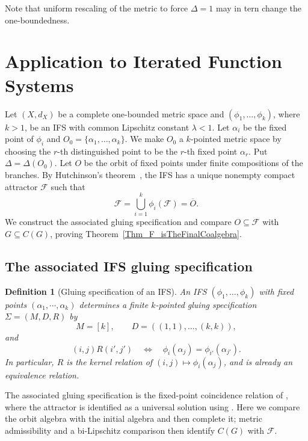 \documentclass{sn-jnl}%
\theoremstyle{thmstyleone}%
\theoremstyle{thmstyletwo}%
\theoremstyle{thmstylethree}%
\newtheorem{definition}{Definition}%
\newcommand{\f}{\phi}
\begin{document}
Note that uniform rescaling of the metric to force $\Delta=1$ may in tern change the one-boundedness.

\section{Application to Iterated Function Systems}
\label{Sec:IFS}
Let $(X,d_X)$ be a complete one-bounded metric space and $(\f_1,\ldots,\f_k)$, where $k>1$, be an IFS with common Lipschitz constant $\lambda<1$. Let $\alpha_i$ be the fixed point of $\f_i$ and $O_0=\{\alpha_1,\ldots,\alpha_k\}$. We make $O_0$ a $k$-pointed metric space by choosing the $r$-th distinguished point to be the $r$-th fixed point $\alpha_r$. Put $\Delta = \Delta(O_0)$. Let $O$ be the orbit of fixed points under finite compositions of the branches. By Hutchinson's theorem~\cite{Hut}, the IFS has a unique nonempty compact attractor $\mathcal F$ such that
\begin{equation} 
\nonumber
    \mathcal F=\bigcup_{i=1}^k\f_i(\mathcal F)=\overline O.
\end{equation}
We construct the associated gluing specification and compare $O\subseteq\mathcal F$ with $G\subseteq C(G)$, proving Theorem~\ref{Thm_F_isTheFinalCoalgebra}.

\subsection{The associated IFS gluing specification}
\label{subsec_AssociatedIFSGluingSpec}

\begin{definition}[Gluing specification of an IFS]
\label{Def_RelationForIFS}
An IFS $(\f_1,\ldots,\f_k)$ with fixed points $(\alpha_1,\cdots, \alpha_k)$ determines a finite $k$-pointed gluing specification $\Sigma=(M,D,R)$ by
\begin{equation} 
\nonumber
    M=[k],\qquad D=((1,1),\ldots,(k,k)),
\end{equation}
and
\begin{equation} 
\nonumber
    (i,j)R(i',j') \quad \Longleftrightarrow \quad \f_i(\alpha_j)=\f_{i'}(\alpha_{j'}).
\end{equation}
In particular, $R$ is the kernel relation of $(i,j)\mapsto\f_i(\alpha_j)$, and is already an equivalence relation.
\end{definition}

The associated gluing specification is the fixed-point coincidence relation of \cite[Example~10.11]{Lein}, where the attractor is identified as a universal solution using \cite[Corollary~9.7]{Lein}. Here we compare the orbit algebra with the initial algebra and then complete it; metric admissibility and a bi-Lipschitz comparison then identify $C(G)$ with $\mathcal F$. 
\end{document}
